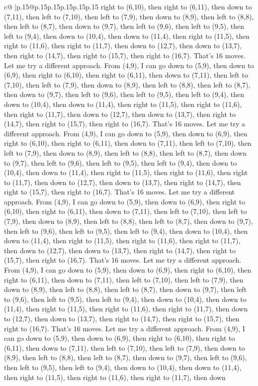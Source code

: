 \documentclass{article}
\begin{document}
{\begin{supertabular}{c@{$\;$}|p{.15\linewidth}@{}p{.15\linewidth}p{.15\linewidth}p{.15\linewidth}p{.15\linewidth}p{.15\linewidth}}
{{{right to (6,10), then right to (6,11), then down to (7,11), then left to (7,10), then left to (7,9), then down to (8,9), then left to (8,8), then left to (8,7), then down to (9,7), then left to (9,6), then left to (9,5), then left to (9,4), then down to (10,4), then down to (11,4), then right to (11,5), then right to (11,6), then right to (11,7), then down to (12,7), then down to (13,7), then right to (14,7), then right to (15,7), then right to (16,7). That's 16 moves. Let me try a different approach. From (4,9), I can go down to (5,9), then down to (6,9), then right to (6,10), then right to (6,11), then down to (7,11), then left to (7,10), then left to (7,9), then down to (8,9), then left to (8,8), then left to (8,7), then down to (9,7), then left to (9,6), then left to (9,5), then left to (9,4), then down to (10,4), then down to (11,4), then right to (11,5), then right to (11,6), then right to (11,7), then down to (12,7), then down to (13,7), then right to (14,7), then right to (15,7), then right to (16,7). That's 16 moves. Let me try a different approach. From (4,9), I can go down to (5,9), then down to (6,9), then right to (6,10), then right to (6,11), then down to (7,11), then left to (7,10), then left to (7,9), then down to (8,9), then left to (8,8), then left to (8,7), then down to (9,7), then left to (9,6), then left to (9,5), then left to (9,4), then down to (10,4), then down to (11,4), then right to (11,5), then right to (11,6), then right to (11,7), then down to (12,7), then down to (13,7), then right to (14,7), then right to (15,7), then right to (16,7). That's 16 moves. Let me try a different approach. From (4,9), I can go down to (5,9), then down to (6,9), then right to (6,10), then right to (6,11), then down to (7,11), then left to (7,10), then left to (7,9), then down to (8,9), then left to (8,8), then left to (8,7), then down to (9,7), then left to (9,6), then left to (9,5), then left to (9,4), then down to (10,4), then down to (11,4), then right to (11,5), then right to (11,6), then right to (11,7), then down to (12,7), then down to (13,7), then right to (14,7), then right to (15,7), then right to (16,7). That's 16 moves. Let me try a different approach. From (4,9), I can go down to (5,9), then down to (6,9), then right to (6,10), then right to (6,11), then down to (7,11), then left to (7,10), then left to (7,9), then down to (8,9), then left to (8,8), then left to (8,7), then down to (9,7), then left to (9,6), then left to (9,5), then left to (9,4), then down to (10,4), then down to (11,4), then right to (11,5), then right to (11,6), then right to (11,7), then down to (12,7), then down to (13,7), then right to (14,7), then right to (15,7), then right to (16,7). That's 16 moves. Let me try a different approach. From (4,9), I can go down to (5,9), then down to (6,9), then right to (6,10), then right to (6,11), then down to (7,11), then left to (7,10), then left to (7,9), then down to (8,9), then left to (8,8), then left to (8,7), then down to (9,7), then left to (9,6), then left to (9,5), then left to (9,4), then down to (10,4), then down to (11,4), then right to (11,5), then right to (11,6), then right to (11,7), then down }}}
\end{supertabular}}
\end{document}
